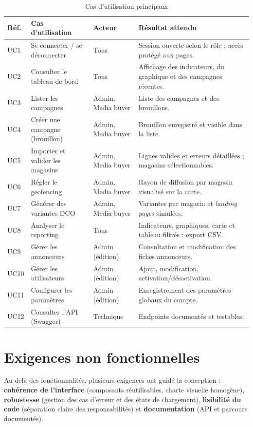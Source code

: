 \begin{table}[H]
\centering
\caption{Cas d'utilisation principaux}
\label{tab:usecases}
\small
\begin{tabularx}{\textwidth}{@{}p{1.1cm}p{3.4cm}p{2.5cm}L@{}}
\toprule
\textbf{Réf.} & \textbf{Cas d'utilisation} & \textbf{Acteur} & \textbf{Résultat attendu} \\
\midrule
UC1 & Se connecter / se déconnecter & Tous & Session ouverte selon le rôle ; accès protégé aux pages. \\
UC2 & Consulter le tableau de bord & Tous & Affichage des indicateurs, du graphique et des campagnes récentes. \\
UC3 & Lister les campagnes & Admin, Media buyer & Liste des campagnes et des brouillons. \\
UC4 & Créer une campagne (brouillon) & Admin, Media buyer & Brouillon enregistré et visible dans la liste. \\
UC5 & Importer et valider les magasins & Admin, Media buyer & Lignes valides et erreurs détaillées ; magasins sélectionnables. \\
UC6 & Régler le geofencing & Admin, Media buyer & Rayon de diffusion par magasin visualisé sur la carte. \\
UC7 & Générer des variantes DCO & Admin, Media buyer & Variantes par magasin et \emph{landing pages} simulées. \\
UC8 & Analyser le reporting & Tous & Indicateurs, graphiques, carte et tableau filtrés ; export CSV. \\
UC9 & Gérer les annonceurs & Admin (édition) & Consultation et modification des fiches annonceurs. \\
UC10 & Gérer les utilisateurs & Admin (édition) & Ajout, modification, activation/désactivation. \\
UC11 & Configurer les paramètres & Admin (édition) & Enregistrement des paramètres globaux du compte. \\
UC12 & Consulter l'API (Swagger) & Technique & Endpoints documentés et testables. \\
\bottomrule
\end{tabularx}
\end{table}

\section{Exigences non fonctionnelles}

Au-delà des fonctionnalités, plusieurs exigences ont guidé la conception :
\textbf{cohérence de l'interface} (composants réutilisables, charte visuelle
homogène), \textbf{robustesse} (gestion des cas d'erreur et des états de
chargement), \textbf{lisibilité du code} (séparation claire des
responsabilités) et \textbf{documentation} (API et parcours documentés).
